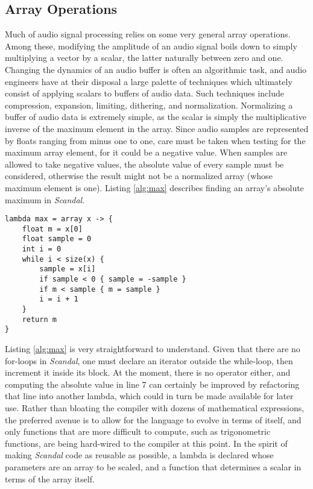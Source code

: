 \subsection{Array Operations}

Much of audio signal processing relies on some very general array operations. Among these, modifying the amplitude of an audio signal boils down to simply multiplying a vector by a scalar, the latter naturally between zero and one. Changing the dynamics of an audio buffer is often an algorithmic task, and audio engineers have at their disposal a large palette of techniques which ultimately consist of applying scalars to buffers of audio data. Such techniques include compression, expansion, limiting, dithering, and normalization. Normalizing a buffer of audio data is extremely simple, as the scalar is simply the multiplicative inverse of the maximum element in the array. Since audio samples are represented by floats ranging from minus one to one, care must be taken when testing for the maximum array element, for it could be a negative value. When samples are allowed to take negative values, the absolute value of every sample must be considered, otherwise the result might not be a normalized array (whose maximum element is one). Listing \ref{alg:max} describes finding an array's absolute maximum in \emph{Scandal}.

\begin{lstlisting}[emph={lambda,array,float,int,while,size,if,return},emphstyle={\textbf},caption={Computing the maximum element of an array.},label={alg:max}]
lambda max = array x -> {
	float m = x[0]
	float sample = 0
	int i = 0
	while i < size(x) {
		sample = x[i]
		if sample < 0 { sample = -sample }
		if m < sample { m = sample }
		i = i + 1
	}
	return m
}
\end{lstlisting}

Listing \ref{alg:max} is very straightforward to understand. Given that there are no for-loops in \emph{Scandal}, one must declare an iterator outside the while-loop, then increment it inside its block. At the moment, there is no  operator either, and computing the absolute value in line 7 can certainly be improved by refactoring that line into another lambda, which could in turn be made available for later use. Rather than bloating the compiler with dozens of mathematical expressions, the preferred avenue is to allow for the language to evolve in terms of itself, and only functions that are more difficult to compute, such as trigonometric functions, are being hard-wired to the compiler at this point. In the spirit of making \emph{Scandal} code as reusable as possible, a  lambda is declared whose parameters are an array to be scaled, and a function that determines a scalar in terms of the array itself.


